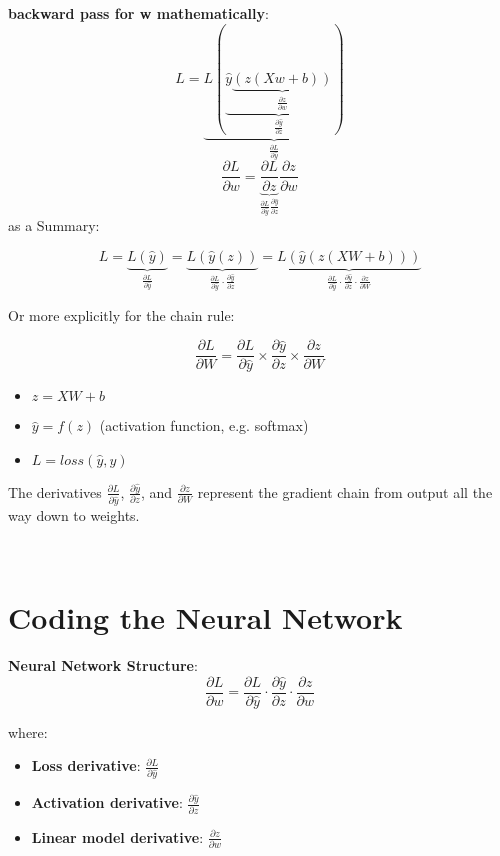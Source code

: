 \documentclass{article}
\newenvironment{cheatformula}[1][כותרת]{
    \begin{minipage}{\linewidth}
    \textbf{#1}: \\
}{
    \end{minipage}\\[0ex]
}
\begin{document}
\begin{cheatformula}[backward pass for w mathematically]
  \begin{equation}
    L =\underbrace{ L(\underbrace{ \hat{y} \underbrace{ (z(Xw+b)) }_{\frac{\partial z} {\partial w} } }_{\frac{\partial \hat{y}} {\partial z}} )}_{\frac{\partial L} {\partial \hat{y}}}
  \end{equation}
  \begin{equation}
    \frac{\partial L} {\partial w}  = \underbrace{\frac{\partial L} {\partial z}}_{ \frac{\partial L} {\partial \hat{y}}  \frac{\partial \hat{y}} {\partial z} } 
    \frac{\partial z} {\partial w}  
  \end{equation}
  as a Summary:

$$
L = \underbrace{L\left(\hat{y}\right)}_{\frac{\partial L}{\partial \hat{y}}} = \underbrace{L\left(\hat{y}\left(z\right)\right)}_{\frac{\partial L}{\partial \hat{y}} \cdot \frac{\partial \hat{y}}{\partial z}} = \underbrace{L\left(\hat{y}\left(z(XW + b)\right)\right)}_{\frac{\partial L}{\partial \hat{y}} \cdot \frac{\partial \hat{y}}{\partial z} \cdot \frac{\partial z}{\partial W}}
$$

Or more explicitly for the chain rule:

$$
\frac{\partial L}{\partial W} = \frac{\partial L}{\partial \hat{y}} \times \frac{\partial \hat{y}}{\partial z} \times \frac{\partial z}{\partial W}
$$

\begin{itemize}
  \item $z = XW + b$
  \item $\hat{y} = f(z)$ (activation function, e.g. softmax)
  \item $L = loss(\hat{y}, y)$
\end{itemize}

The derivatives $\frac{\partial L}{\partial \hat{y}}$, $\frac{\partial \hat{y}}{\partial z}$, and $\frac{\partial z}{\partial W}$ represent the gradient chain from output all the way down to weights.


  
\end{cheatformula}


\section{Coding the Neural Network}
\begin{cheatformula}[Neural Network Structure]

  \[
  \frac{\partial L}{\partial w} 
  = \frac{\partial L}{\partial \hat{y}} \cdot \frac{\partial \hat{y}}{\partial z} \cdot \frac{\partial z}{\partial w}
  \]
  
  where:
  \begin{itemize}
      \item \textbf{Loss derivative}: $\frac{\partial L}{\partial \hat{y}}$
      \item \textbf{Activation derivative}: $\frac{\partial \hat{y}}{\partial z}$
      \item \textbf{Linear model derivative}: $\frac{\partial z}{\partial w}$
  \end{itemize}
\end{cheatformula}
\end{document}
